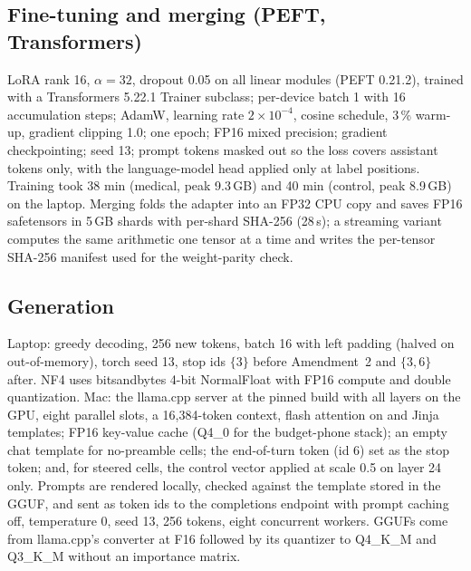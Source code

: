 \subsection{Fine-tuning and merging (PEFT, Transformers)}
LoRA rank 16, $\alpha = 32$, dropout 0.05 on all linear modules (PEFT 0.21.2), trained with a Transformers 5.22.1 Trainer subclass; per-device batch 1 with 16 accumulation steps; AdamW, learning rate $2\times10^{-4}$, cosine schedule, 3\,\% warm-up, gradient clipping 1.0; one epoch; FP16 mixed precision; gradient checkpointing; seed 13; prompt tokens masked out so the loss covers assistant tokens only, with the language-model head applied only at label positions. Training took 38 min (medical, peak 9.3\,GB) and 40 min (control, peak 8.9\,GB) on the laptop. Merging folds the adapter into an FP32 CPU copy and saves FP16 safetensors in 5\,GB shards with per-shard SHA-256 (28\,s); a streaming variant computes the same arithmetic one tensor at a time and writes the per-tensor SHA-256 manifest used for the weight-parity check.

\subsection{Generation}
Laptop: greedy decoding, 256 new tokens, batch 16 with left padding (halved on out-of-memory), torch seed 13, stop ids $\{3\}$ before Amendment~2 and $\{3, 6\}$ after. NF4 uses bitsandbytes 4-bit NormalFloat with FP16 compute and double quantization. Mac: the llama.cpp server at the pinned build with all layers on the GPU, eight parallel slots, a 16,384-token context, flash attention on and Jinja templates; FP16 key-value cache (Q4\_0 for the budget-phone stack); an empty chat template for no-preamble cells; the end-of-turn token (id 6) set as the stop token; and, for steered cells, the control vector applied at scale 0.5 on layer 24 only. Prompts are rendered locally, checked against the template stored in the GGUF, and sent as token ids to the completions endpoint with prompt caching off, temperature 0, seed 13, 256 tokens, eight concurrent workers. GGUFs come from llama.cpp's converter at F16 followed by its quantizer to Q4\_K\_M and Q3\_K\_M without an importance matrix.

